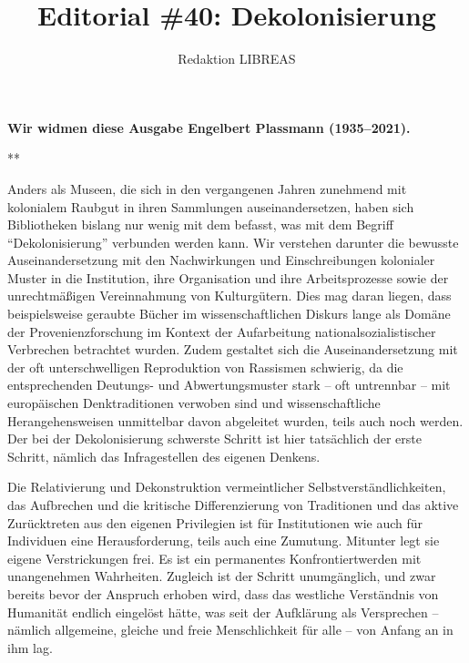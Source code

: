 \documentclass[a4paper,
fontsize=11pt,
oneside,
numbers=noperiodatend,
parskip=half-,
bibliography=totoc,
final
]{scrartcl}
\title{\LARGE{Editorial \#40: Dekolonisierung}}%
\author{Redaktion LIBREAS} %
\date{}
\begin{document}
\maketitle
\thispagestyle{fancyplain} 


{\par \centering \textbf{Wir widmen diese Ausgabe Engelbert Plassmann (1935--2021).}\par}

{\par \centering ***\par}

Anders als Museen, die sich in den vergangenen Jahren zunehmend mit
kolonialem Raubgut in ihren Sammlungen auseinandersetzen, haben sich
Bibliotheken bislang nur wenig mit dem befasst, was mit dem Begriff
\enquote{Dekolonisierung} verbunden werden kann. Wir verstehen darunter
die bewusste Auseinandersetzung mit den Nachwirkungen und
Einschreibungen kolonialer Muster in die Institution, ihre Organisation
und ihre Arbeitsprozesse sowie der unrechtmäßigen Vereinnahmung von
Kulturgütern. Dies mag daran liegen, dass beispielsweise geraubte Bücher
im wissenschaftlichen Diskurs lange als Domäne der Provenienzforschung
im Kontext der Aufarbeitung nationalsozialistischer Verbrechen
betrachtet wurden. Zudem gestaltet sich die Auseinandersetzung mit der
oft unterschwelligen Reproduktion von Rassismen schwierig, da die
entsprechenden Deutungs- und Abwertungsmuster stark -- oft untrennbar --
mit europäischen Denktraditionen verwoben sind und wissenschaftliche
Herangehensweisen unmittelbar davon abgeleitet wurden, teils auch noch
werden. Der bei der Dekolonisierung schwerste Schritt ist hier
tatsächlich der erste Schritt, nämlich das Infragestellen des eigenen
Denkens.

Die Relativierung und Dekonstruktion vermeintlicher
Selbstverständlichkeiten, das Aufbrechen und die kritische
Differenzierung von Traditionen und das aktive Zurücktreten aus den
eigenen Privilegien ist für Institutionen wie auch für Individuen eine
Herausforderung, teils auch eine Zumutung. Mitunter legt sie eigene
Verstrickungen frei. Es ist ein permanentes Konfrontiertwerden mit
unangenehmen Wahrheiten. Zugleich ist der Schritt unumgänglich, und zwar
bereits bevor der Anspruch erhoben wird, dass das westliche Verständnis
von Humanität endlich eingelöst hätte, was seit der Aufklärung als
Versprechen -- nämlich allgemeine, gleiche und freie Menschlichkeit für
alle -- von Anfang an in ihm lag.
\end{document}
